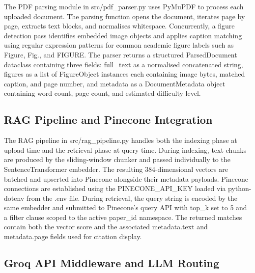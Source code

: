 The PDF parsing module in src/pdf\_parser.py uses PyMuPDF to process each uploaded document. The parsing function opens the document, iterates page by page, extracts text blocks, and normalises whitespace. Concurrently, a figure detection pass identifies embedded image objects and applies caption matching using regular expression patterns for common academic figure labels such as Figure, Fig., and FIGURE.
\newline \newline The parser returns a structured ParsedDocument dataclass containing three fields: full\_text as a normalised concatenated string, figures as a list of FigureObject instances each containing image bytes, matched caption, and page number, and metadata as a DocumentMetadata object containing word count, page count, and estimated difficulty level.

\subsection{RAG Pipeline and Pinecone Integration}

The RAG pipeline in src/rag\_pipeline.py handles both the indexing phase at upload time and the retrieval phase at query time.
\newline \newline During indexing, text chunks are produced by the sliding-window chunker and passed individually to the SentenceTransformer embedder. The resulting 384-dimensional vectors are batched and upserted into Pinecone alongside their metadata payloads. Pinecone connections are established using the PINECONE\_API\_KEY loaded via python-dotenv from the .env file.
\newline \newline During retrieval, the query string is encoded by the same embedder and submitted to Pinecone's query API with top\_k set to 5 and a filter clause scoped to the active paper\_id namespace. The returned matches contain both the vector score and the associated metadata.text and metadata.page fields used for citation display.

\subsection{Groq API Middleware and LLM Routing}

